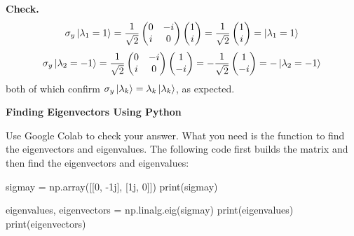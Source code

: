 \documentclass[a4paper, 10pt]{article}
\begin{document}
\begin{solution}
	\noindent \textbf{Check.}
	\[
		\sigma_y \ket{\lambda_1 = 1} = \frac{1}{\sqrt{2}}\begin{pmatrix}
			0 & -i \\
			i & 0
		\end{pmatrix}\begin{pmatrix}
			1 \\ i
		\end{pmatrix} = \frac{1}{\sqrt{2}}\begin{pmatrix}
			1 \\ i
		\end{pmatrix} = \ket{\lambda_1 = 1}
	\]
	\[
		\sigma_y \ket{\lambda_2 = -1} = \frac{1}{\sqrt{2}}\begin{pmatrix}
			0 & -i \\
			i & 0
		\end{pmatrix}\begin{pmatrix}
			1 \\ -i
		\end{pmatrix} = -\frac{1}{\sqrt{2}}\begin{pmatrix}
			1 \\ -i
		\end{pmatrix} = -\ket{\lambda_2 = -1}
	\]
	both of which confirm \( \sigma_y \ket{\lambda_k} = \lambda_k \ket{\lambda_k} \), as expected.
\end{solution}

\newpage

\begin{problem}
\textbf{Finding Eigenvectors Using Python}
\par Use Google Colab to check your answer. What you need is the function to find the
eigenvectors and eigenvalues. The following code first builds the matrix and then find the
eigenvectors and eigenvalues:
\begin{codingbox}
sigmay = np.array([[0, -1j], [1j, 0]])
print(sigmay)

eigenvalues, eigenvectors = np.linalg.eig(sigmay)
print(eigenvalues)
print(eigenvectors)
\end{codingbox}
\end{problem}
\end{document}
